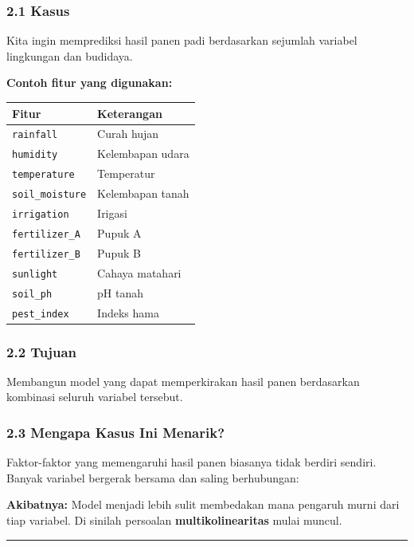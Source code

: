 \documentclass[12pt,a4paper]{article}
\begin{document}
\subsubsection{2.1 Kasus}

Kita ingin memprediksi hasil panen padi berdasarkan sejumlah variabel lingkungan dan budidaya.


\textbf{Contoh fitur yang digunakan:}


\begin{tabular}{|l|l|}
\hline
Fitur & Keterangan \\
\hline
\texttt{rainfall} & Curah hujan \\
\hline
\texttt{humidity} & Kelembapan udara \\
\hline
\texttt{temperature} & Temperatur \\
\hline
\texttt{soil_moisture} & Kelembapan tanah \\
\hline
\texttt{irrigation} & Irigasi \\
\hline
\texttt{fertilizer_A} & Pupuk A \\
\hline
\texttt{fertilizer_B} & Pupuk B \\
\hline
\texttt{sunlight} & Cahaya matahari \\
\hline
\texttt{soil_ph} & pH tanah \\
\hline
\texttt{pest_index} & Indeks hama \\
\hline
\end{tabular}


\subsubsection{2.2 Tujuan}

Membangun model yang dapat memperkirakan hasil panen berdasarkan kombinasi seluruh variabel tersebut.


\subsubsection{2.3 Mengapa Kasus Ini Menarik?}

Faktor-faktor yang memengaruhi hasil panen biasanya tidak berdiri sendiri. Banyak variabel bergerak bersama dan saling berhubungan:



\textbf{Akibatnya:} Model menjadi lebih sulit membedakan mana pengaruh murni dari tiap variabel. Di sinilah persoalan \textbf{multikolinearitas} mulai muncul.


\hrule
\end{document}
